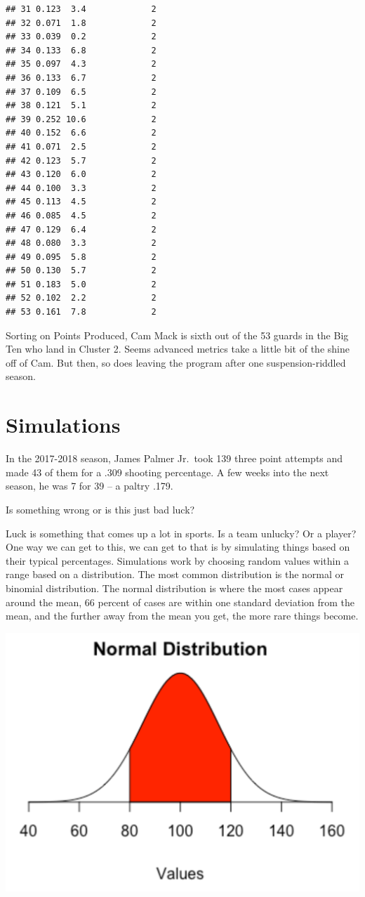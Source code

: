 \documentclass[
]{book}
\begin{document}
\begin{verbatim}
## 31 0.123  3.4             2
## 32 0.071  1.8             2
## 33 0.039  0.2             2
## 34 0.133  6.8             2
## 35 0.097  4.3             2
## 36 0.133  6.7             2
## 37 0.109  6.5             2
## 38 0.121  5.1             2
## 39 0.252 10.6             2
## 40 0.152  6.6             2
## 41 0.071  2.5             2
## 42 0.123  5.7             2
## 43 0.120  6.0             2
## 44 0.100  3.3             2
## 45 0.113  4.5             2
## 46 0.085  4.5             2
## 47 0.129  6.4             2
## 48 0.080  3.3             2
## 49 0.095  5.8             2
## 50 0.130  5.7             2
## 51 0.183  5.0             2
## 52 0.102  2.2             2
## 53 0.161  7.8             2
\end{verbatim}

Sorting on Points Produced, Cam Mack is sixth out of the 53 guards in the Big Ten who land in Cluster 2. Seems advanced metrics take a little bit of the shine off of Cam. But then, so does leaving the program after one suspension-riddled season.

\hypertarget{simulations}{%
\chapter{Simulations}\label{simulations}}

In the 2017-2018 season, James Palmer Jr.~took 139 three point attempts and made 43 of them for a .309 shooting percentage. A few weeks into the next season, he was 7 for 39 -- a paltry .179.

Is something wrong or is this just bad luck?

Luck is something that comes up a lot in sports. Is a team unlucky? Or a player? One way we can get to this, we can get to that is by simulating things based on their typical percentages. Simulations work by choosing random values within a range based on a distribution. The most common distribution is the normal or binomial distribution. The normal distribution is where the most cases appear around the mean, 66 percent of cases are within one standard deviation from the mean, and the further away from the mean you get, the more rare things become.

\includegraphics[width=17.64in]{images/simulations2}
\end{document}
